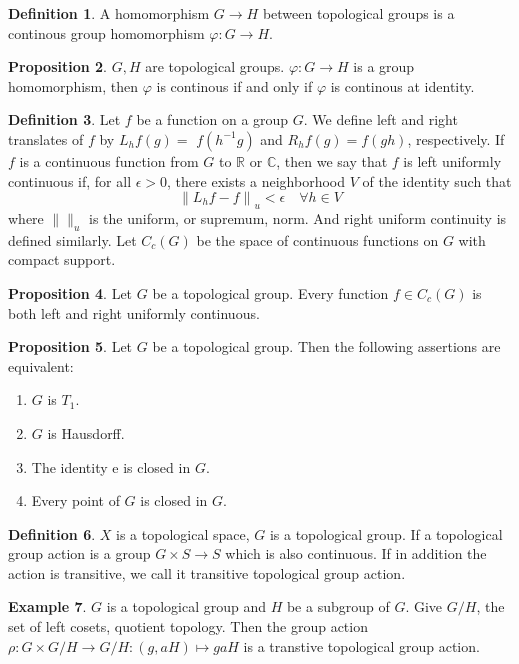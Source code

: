 \documentclass[12pt,a4paper]{book}
\newenvironment{enu}{\begin{enumerate}[(1)]}{\end{enumerate}}
\theoremstyle{definition}
\newtheorem{defn}{Definition}[section]
\newtheorem{prop}[defn]{Proposition}
\newtheorem{exam}[defn]{Example}
\begin{document}
\begin{defn}
    A homomorphism $G\rightarrow H$ between topological groups is a continous group homomorphism $\varphi:G\rightarrow H$.
\end{defn}
\begin{prop}
    $G,H$ are topological groups.
    $\varphi:G \rightarrow H$ is a group homomorphism, then $\varphi$ is continous if and only if $\varphi$ is continous at identity.
    \label{proposition: continous homemorphism between topological group}
\end{prop}
\begin{defn}
    Let $f$ be a function on a group $G$. We define left and right translates of $f$ by $L_h f(g)=$ $f\left(h^{-1} g\right)$ and $R_h f(g)=f(g h)$, respectively. If $f$ is a continuous function from $G$ to $\mathbb{R}$ or $\mathbb{C}$, then we say that $f$ is left uniformly continuous if, for all $\epsilon>0$, there exists a neighborhood $V$ of the identity such that
    $$
        \left\|L_h f-f\right\|_u<\epsilon \quad \forall h \in V
    $$
    where $\|\|_u$ is the uniform, or supremum, norm. And right uniform continuity is defined similarly. Let $C_c(G)$ be the space of continuous functions on $G$ with compact support.
\end{defn}
\begin{prop}
    Let $G$ be a topological group. Every function $f \in C_c(G)$ is both left and right uniformly continuous.
\end{prop}
\begin{prop}
    Let $G$ be a topological group. Then the following assertions are equivalent:
    \begin{enu}
        \item $G$ is $T_1$.
        \item $G$ is Hausdorff.
        \item The identity e is closed in $G$.
        \item Every point of $G$ is closed in $G$.
    \end{enu}
\end{prop}
\begin{defn}
    $X$ is a topological space, $G$ is a topological group. If a topological group action is a group $G\times S\rightarrow S$ which is also continuous.
    If in addition the action is transitive, we call it transitive topological group action.
\end{defn}
\begin{exam}
    $G$ is a topological group and $H$ be a subgroup of $G$. Give $G/H$, the set of left cosets, quotient topology. Then the group action
    $\rho:G\times G/H\rightarrow G/H: (g,aH)\mapsto gaH$ is a transtive topological group action.
\end{exam}
\end{document}
